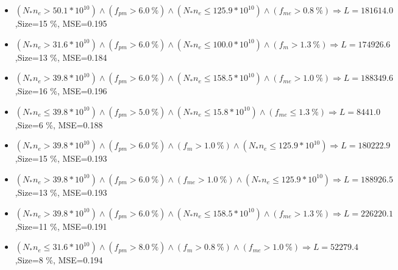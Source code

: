 \documentclass[numbered]{CSL}
\begin{document}
\begin{itemize}
\item $(N_* n_e > 50.1 * 10^{10}) \land (f_{pm} > 6.0~\%) \land (N_* n_e \leq 125.9 * 10^{10}) \land (f_{me} > 0.8~\%) \Rightarrow L = 181614.0$,\hfill Size=15 \%, MSE=0.195
\item $(N_* n_e > 31.6 * 10^{10}) \land (f_{pm} > 6.0~\%) \land (N_* n_e \leq 100.0 * 10^{10}) \land (f_m > 1.3~\%) \Rightarrow L = 174926.6$,\hfill Size=13 \%, MSE=0.184
\item $(N_* n_e > 39.8 * 10^{10}) \land (f_{pm} > 6.0~\%) \land (N_* n_e \leq 158.5 * 10^{10}) \land (f_{me} > 1.0~\%) \Rightarrow L = 188349.6$,\hfill Size=16 \%, MSE=0.196
\item $(N_* n_e \leq 39.8 * 10^{10}) \land (f_{pm} > 5.0~\%) \land (N_* n_e \leq 15.8 * 10^{10}) \land (f_{me} \leq 1.3~\%) \Rightarrow L = 8441.0$,\hfill Size=6 \%, MSE=0.188
\item $(N_* n_e > 39.8 * 10^{10}) \land (f_{pm} > 6.0~\%) \land (f_m > 1.0~\%) \land (N_* n_e \leq 125.9 * 10^{10}) \Rightarrow L = 180222.9$,\hfill Size=15 \%, MSE=0.193
\item $(N_* n_e > 39.8 * 10^{10}) \land (f_{pm} > 6.0~\%) \land (f_{me} > 1.0~\%) \land (N_* n_e \leq 125.9 * 10^{10}) \Rightarrow L = 188926.5$,\hfill Size=13 \%, MSE=0.193
\item $(N_* n_e > 39.8 * 10^{10}) \land (f_{pm} > 6.0~\%) \land (N_* n_e \leq 158.5 * 10^{10}) \land (f_{me} > 1.3~\%) \Rightarrow L = 226220.1$,\hfill Size=11 \%, MSE=0.191
\item $(N_* n_e \leq 31.6 * 10^{10}) \land (f_{pm} > 8.0~\%) \land (f_m > 0.8~\%) \land (f_{me} > 1.0~\%) \Rightarrow L = 52279.4$,\hfill Size=8 \%, MSE=0.194
\end{itemize}
\end{document}

